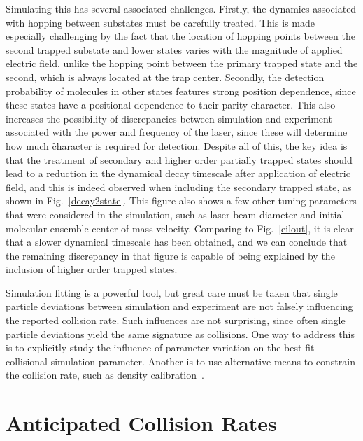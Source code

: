 Simulating this has several associated challenges.
Firstly, the dynamics associated with hopping between substates must be carefully treated.
This is made especially challenging by the fact that the location of hopping points between the second trapped substate and lower states varies with the magnitude of applied electric field, unlike the hopping point between the primary trapped state and the second, which is always located at the trap center.
Secondly, the detection probability of molecules in other states features strong position dependence, since these states have a positional dependence to their parity character.
This also increases the possibility of discrepancies between simulation and experiment associated with the power and frequency of the laser, since these will determine how much \f character is required for detection.
Despite all of this, the key idea is that the treatment of secondary and higher order partially trapped states should lead to a reduction in the dynamical decay timescale after application of electric field, and this is indeed observed when including the secondary trapped state, as shown in Fig.~\ref{decay2state}.
This figure also shows a few other tuning parameters that were considered in the simulation, such as laser beam diameter and initial molecular ensemble center of mass velocity.
Comparing to Fig.~\ref{eilout}, it is clear that a slower dynamical timescale has been obtained, and we can conclude that the remaining discrepancy in that figure is capable of being explained by the inclusion of higher order trapped states.

Simulation fitting is a powerful tool, but great care must be taken that single particle deviations between simulation and experiment are not falsely influencing the reported collision rate.
Such influences are not surprising, since often single particle deviations yield the same signature as collisions.
One way to address this is to explicitly study the influence of parameter variation on the best fit collisional simulation parameter.
Another is to use alternative means to constrain the collision rate, such as density calibration~\citep[Chapter~4]{WuThesis2019}. 

\section{Anticipated Collision Rates}

